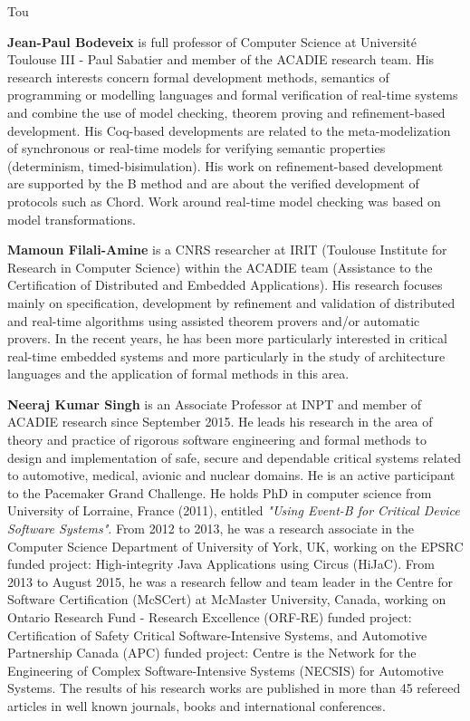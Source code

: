 \begin{sitedescription}{Tou}
\begin{compactitem}
\item{\bf  Jean-Paul Bodeveix} is full professor of Computer Science at Universit\'e Toulouse III - Paul Sabatier  and member of the ACADIE research team. His research interests concern formal development
methods, semantics of programming or modelling languages and formal verification of real-time systems and combine the use of model checking, theorem proving and refinement-based development. His Coq-based developments are related to the meta-modelization of synchronous or real-time models for verifying semantic properties (determinism, timed-bisimulation). His work on refinement-based development are supported by the B method and are about the verified development of protocols such as Chord. Work around real-time model checking was based on model transformations.

\item{\bf  Mamoun Filali-Amine}  is a CNRS researcher at IRIT (Toulouse Institute for Research in Computer Science)
within the ACADIE team (Assistance to the Certification of Distributed and Embedded Applications).
His research focuses mainly on specification, development by refinement and validation of distributed and real-time algorithms using  assisted theorem provers and/or automatic provers. In the recent years, he has been more particularly interested in critical real-time embedded systems and more particularly in the study of architecture languages and the application of formal methods in this area.

\item{\bf   Neeraj Kumar Singh} is an Associate Professor at INPT and member of  ACADIE research since September 2015. He leads his research in the area of theory and practice of rigorous software engineering and formal methods to design and implementation of safe, secure and dependable critical systems related to automotive, medical, avionic and nuclear domains. He is an active participant to the Pacemaker Grand Challenge. He holds PhD in computer science from University of Lorraine, France (2011), entitled  \textit{"Using Event-B for Critical Device Software Systems"}. From  2012 to  2013, he was a research associate in the Computer Science Department of University of York, UK, working on the  EPSRC funded project: High-integrity Java Applications using Circus (HiJaC). From 2013 to August 2015, he was a research fellow and team leader in the Centre for Software Certification (McSCert) at McMaster University, Canada, working on Ontario Research Fund - Research Excellence (ORF-RE) funded project: Certification of Safety Critical Software-Intensive Systems, and Automotive Partnership Canada (APC) funded project: Centre is the Network for the Engineering of Complex Software-Intensive Systems (NECSIS) for Automotive Systems.  The results of his research works are published in more than 45 refereed articles in well known journals, books and international conferences.

\end{compactitem}

\end{sitedescription}

